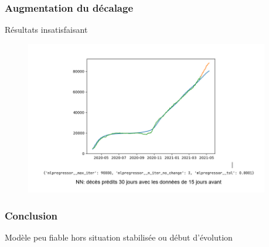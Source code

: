 \documentclass{beamer}
\begin{document}
\begin{frame}
	\frametitle{Augmentation du décalage}
	Résultats insatisfaisant
	\begin{figure}
		\includegraphics[width=0.95\textwidth]{NN_2}
	\end{figure}
\end{frame}

\begin{frame}
	\frametitle{Conclusion}
	Modèle peu fiable hors situation stabilisée ou début d'évolution
\end{frame}
\end{document}
